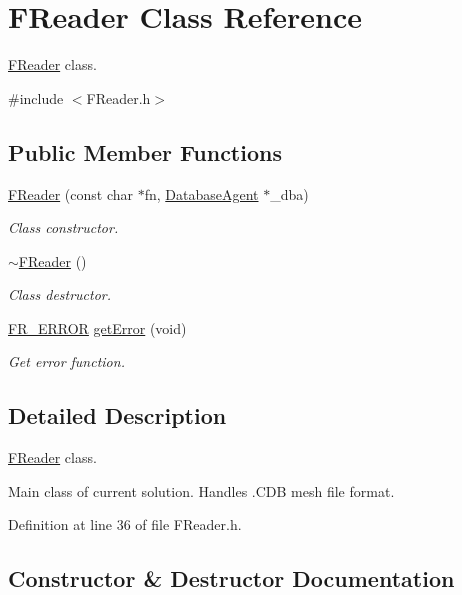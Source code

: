 \hypertarget{class_f_reader}{}\section{F\+Reader Class Reference}
\label{class_f_reader}


\hyperlink{class_f_reader}{F\+Reader} class.  




{\ttfamily \#include $<$F\+Reader.\+h$>$}

\subsection*{Public Member Functions}
\begin{DoxyCompactItemize}
\item 
\hyperlink{class_f_reader_aa55d84e221cf8cfa66ac5e692ae5c994}{F\+Reader} (const char $\ast$fn, \hyperlink{class_database_agent}{Database\+Agent} $\ast$\+\_\+dba)
\begin{DoxyCompactList}\small\item\em Class constructor. \end{DoxyCompactList}\item 
\hyperlink{class_f_reader_aca652fd77d9796535f920496e3329083}{$\sim$\+F\+Reader} ()
\begin{DoxyCompactList}\small\item\em Class destructor. \end{DoxyCompactList}\item 
\hyperlink{_file_structs_8h_ae183556f32e14e06d49b270ca950d90a}{F\+R\+\_\+\+E\+R\+R\+OR} \hyperlink{class_f_reader_abd5dae242af5ba546df2e27acf1644e9}{get\+Error} (void)
\begin{DoxyCompactList}\small\item\em Get error function. \end{DoxyCompactList}\end{DoxyCompactItemize}


\subsection{Detailed Description}
\hyperlink{class_f_reader}{F\+Reader} class. 

Main class of current solution. Handles .C\+DB mesh file format. 

Definition at line 36 of file F\+Reader.\+h.



\subsection{Constructor \& Destructor Documentation}
